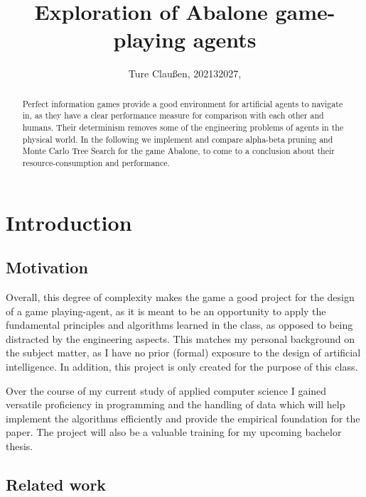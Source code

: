 \documentclass{../llncs}
\begin{document}
\title{Exploration of Abalone game-playing agents}
\author{Ture Claußen, 202132027, }

{\def\addcontentsline#1#2#3{}\maketitle} %

\begin{abstract}
	Perfect information games provide a good environment for artificial agents to navigate in, as they have a clear performance measure for comparison with each other and humans. Their determinism removes some of the engineering problems of agents in the physical world. In the following we implement and compare alpha-beta pruning and Monte Carlo Tree Search for the game Abalone, to come to a conclusion about their resource-consumption and performance.
\end{abstract}

\section{Introduction}

\subsection{Motivation}
Overall, this degree of complexity makes the game a good project for the design of a game playing-agent, as it is meant to be an opportunity to apply the fundamental principles and algorithms learned in the class, as opposed to being distracted by the engineering aspects. This matches my personal background on the subject matter, as I have no prior (formal) exposure to the design of artificial intelligence. In addition, this project is only created for the purpose of this class.

Over the course of my current study of applied computer science I gained versatile proficiency in programming and the handling of data which will help implement the algorithms efficiently and provide the empirical foundation for the paper. The project will also be a valuable training for my upcoming bachelor thesis.

\subsection{Related work}
\end{document}
